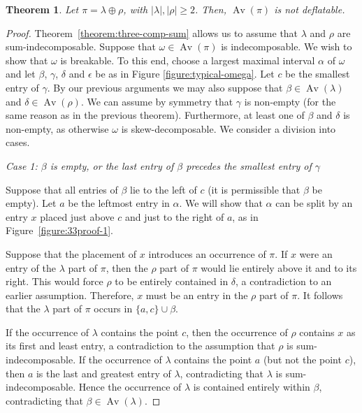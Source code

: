 \documentclass[10pt]{article}
\newcommand{\note}[1]{
	\marginpar{{\footnotesize\it #1}}
}
\theoremstyle{plain}
\newtheorem{theorem}{Theorem}[section]
\newcommand{\Av}{\operatorname{Av}}
\begin{document}
\begin{theorem}
	\label{theorem:33proof}
	Let $\pi = \lambda \oplus \rho$, with $|\lambda|, |\rho| \geq 2$. Then, $\Av(\pi)$ is not deflatable. 
\end{theorem}
\begin{proof}
	Theorem~\ref{theorem:three-comp-sum} allows us to assume that $\lambda$ and $\rho$ are sum-indecomposable.	Suppose that $\omega \in \Av(\pi)$ is indecomposable. We wish to show that $\omega$ is breakable. To this end, choose a largest maximal interval $\alpha$ of $\omega$ and let $\beta$, $\gamma$, $\delta$ and $\epsilon$ be as in Figure \ref{figure:typical-omega}. Let $c$ be the smallest entry of $\gamma$. By our previous arguments we may also suppose that $\beta \in \Av(\lambda)$ and $\delta \in \Av(\rho)$. We can assume by symmetry that $\gamma$ is non-empty (for the same reason as in the previous theorem). Furthermore, at least one of $\beta$ and $\delta$ is non-empty, as otherwise $\omega$ is skew-decomposable. We consider a division into cases.
		
	 \bigskip
 
	\emph{Case 1: $\beta$ is empty, or the last entry of $\beta$ precedes the smallest entry of $\gamma$}

Suppose that all entries of $\beta$ lie to the left of $c$ (it is permissible that $\beta$ be empty). Let $a$ be the leftmost entry in $\alpha$. We will show that $\alpha$ can be split by an entry $x$ placed just above $c$ and just to the right of $a$, as in Figure~\ref{figure:33proof-1}.



Suppose that the placement of $x$ introduces an occurrence of $\pi$. If $x$ were an entry of the $\lambda$ part of $\pi$, then the $\rho$ part of $\pi$ would lie entirely above it and to its right. This would force $\rho$ to be entirely contained in $\delta$, a contradiction to an earlier assumption. Therefore, $x$ must be an entry in the $\rho$ part of $\pi$. It follows that the $\lambda$ part of $\pi$ occurs in $\{a,c\} \cup \beta$.

If the occurrence of $\lambda$ contains the point $c$, then the occurrence of $\rho$ contains $x$ as its first and least entry, a contradiction to the assumption that $\rho$ is sum-indecomposable. If the occurrence of $\lambda$ contains the point $a$ (but not the point $c$), then $a$ is the last and greatest entry of $\lambda$, contradicting that $\lambda$ is sum-indecomposable. Hence the occurrence of $\lambda$ is contained entirely within $\beta$, contradicting that $\beta \in \Av(\lambda)$.


\end{proof}
\end{document}
